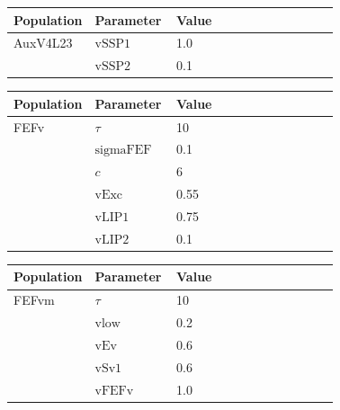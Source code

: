 \documentclass{article}
\begin{document}
\vspace{2ex}

\noindent
\begin{tabularx}{\linewidth}{|p{0.25\linewidth}|p{0.25\linewidth}|X|}\hline
\textbf{Population} & \textbf{Parameter} & \textbf{Value}   \\ \hline

    AuxV4L23             & ${\text{vSSP1}}$        & 1.0  \\ \hline

                 & ${\text{vSSP2}}$        & 0.1  \\ \hline

\end{tabularx}

\vspace{2ex}

\noindent
\begin{tabularx}{\linewidth}{|p{0.25\linewidth}|p{0.25\linewidth}|X|}\hline
\textbf{Population} & \textbf{Parameter} & \textbf{Value}   \\ \hline

    FEFv             & $\tau$        & 10  \\ \hline

                 & ${\text{sigmaFEF}}$        & 0.1  \\ \hline

                 & $c$        & 6  \\ \hline

                 & ${\text{vExc}}$        & 0.55  \\ \hline

                 & ${\text{vLIP1}}$        & 0.75  \\ \hline

                 & ${\text{vLIP2}}$        & 0.1  \\ \hline

\end{tabularx}

\vspace{2ex}

\noindent
\begin{tabularx}{\linewidth}{|p{0.25\linewidth}|p{0.25\linewidth}|X|}\hline
\textbf{Population} & \textbf{Parameter} & \textbf{Value}   \\ \hline

    FEFvm             & $\tau$        & 10  \\ \hline

                 & ${\text{vlow}}$        & 0.2  \\ \hline

                 & ${\text{vEv}}$        & 0.6  \\ \hline

                 & ${\text{vSv1}}$        & 0.6  \\ \hline

                 & ${\text{vFEFv}}$        & 1.0  \\ \hline

\end{tabularx}
\end{document}
